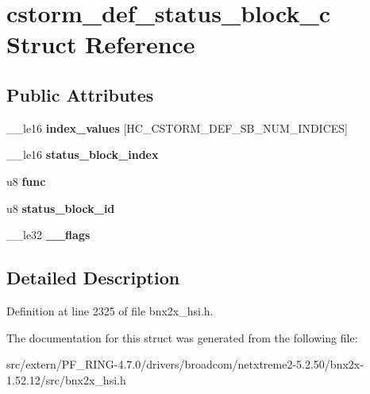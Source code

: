 \hypertarget{structcstorm__def__status__block__c}{
\section{cstorm\_\-def\_\-status\_\-block\_\-c Struct Reference}
\label{structcstorm__def__status__block__c}
}
\subsection*{Public Attributes}
\begin{DoxyCompactItemize}
\item 
\hypertarget{structcstorm__def__status__block__c_a1c1ffc61ebd4fc23380f851e8c9fa47e}{
\_\-\_\-le16 {\bfseries index\_\-values} \mbox{[}HC\_\-CSTORM\_\-DEF\_\-SB\_\-NUM\_\-INDICES\mbox{]}}
\label{structcstorm__def__status__block__c_a1c1ffc61ebd4fc23380f851e8c9fa47e}

\item 
\hypertarget{structcstorm__def__status__block__c_a77add78e04bba796d215a73c6593bc62}{
\_\-\_\-le16 {\bfseries status\_\-block\_\-index}}
\label{structcstorm__def__status__block__c_a77add78e04bba796d215a73c6593bc62}

\item 
\hypertarget{structcstorm__def__status__block__c_ac7aba987fbaee7b0e2f017a2eb3dc630}{
u8 {\bfseries func}}
\label{structcstorm__def__status__block__c_ac7aba987fbaee7b0e2f017a2eb3dc630}

\item 
\hypertarget{structcstorm__def__status__block__c_a371b150d42a139b2fec44f4d1f1e658d}{
u8 {\bfseries status\_\-block\_\-id}}
\label{structcstorm__def__status__block__c_a371b150d42a139b2fec44f4d1f1e658d}

\item 
\hypertarget{structcstorm__def__status__block__c_ac3740214092025174b8064007fe97d5c}{
\_\-\_\-le32 {\bfseries \_\-\_\-flags}}
\label{structcstorm__def__status__block__c_ac3740214092025174b8064007fe97d5c}

\end{DoxyCompactItemize}


\subsection{Detailed Description}


Definition at line 2325 of file bnx2x\_\-hsi.h.



The documentation for this struct was generated from the following file:\begin{DoxyCompactItemize}
\item 
src/extern/PF\_\-RING-\/4.7.0/drivers/broadcom/netxtreme2-\/5.2.50/bnx2x-\/1.52.12/src/bnx2x\_\-hsi.h\end{DoxyCompactItemize}
